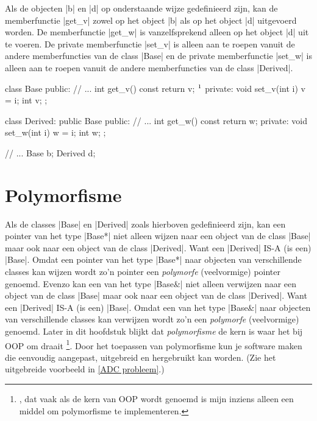 \begin{cpplstShortInline}
Als de objecten |b| en |d| op onderstaande wijze gedefinieerd zijn, kan de memberfunctie |get_v| zowel op het object |b| als op het object |d| uitgevoerd worden.
De memberfunctie |get_w| is vanzelfsprekend alleen op het object |d| uit te voeren.
De private memberfunctie |set_v| is alleen aan te roepen vanuit de andere memberfuncties van de class |Base| en de private memberfunctie |set_w| is alleen aan te roepen vanuit de andere memberfuncties van de class |Derived|.

\begin{cpplstfragment}[mathescape=true]
class Base {
public:
    // ...
    int get_v() const { return v; }$\footnotemark$
private:
    void set_v(int i) { v = i; }
    int v;
};

class Derived: public Base {
public:
    // ...
    int get_w() const { return w; }
private:
    void set_w(int i) { w = i; }
    int w;
};

//  ...
    Base b;
    Derived d;
\end{cpplstfragment}


\section{Polymorfisme}
\label{sec:polymorfisme}
Als de classes |Base| en |Derived| zoals hierboven gedefinieerd zijn, kan een pointer van het type |Base*| niet alleen wijzen naar een object van de class |Base| maar ook naar een object van de class |Derived|.
Want een |Derived| IS-A (is een) |Base|.
Omdat een pointer van het type |Base*| naar objecten van verschillende classes kan wijzen wordt zo'n pointer een  \label{sec:polymorfepointer} \emph{polymorfe} (veelvormige) pointer genoemd.
Evenzo kan een  van het type |Base&| niet alleen verwijzen naar een object van de class |Base| maar ook naar een object van de class |Derived|.
Want een |Derived| IS-A (is een) |Base|.
Omdat een  van het type |Base&| naar objecten van verschillende classes kan verwijzen wordt zo'n  een \emph{polymorfe} (veelvormige)  genoemd.
Later in dit hoofdstuk blijkt dat \emph{polymorfisme} de kern is waar het bij OOP om draait%
\footnote{%
    , dat vaak als de kern van OOP wordt genoemd is mijn inziens alleen een middel om polymorfisme te implementeren.
}.
Door het toepassen van polymorfisme kun je software maken die eenvoudig aangepast, uitgebreid en hergebruikt kan worden.
(Zie het uitgebreide voorbeeld in \cref{ADC probleem}.)


\end{cpplstShortInline}
